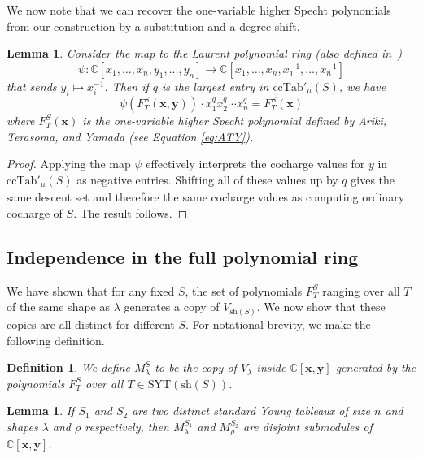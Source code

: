 \documentclass[11pt]{article}
\newtheorem{definition}[theo]{Definition}
\newtheorem{lemma}[theo]{Lemma}
\theoremstyle{definition}
\numberwithin{equation}{section}
\newcommand{\SYT}{\mathrm{SYT}}
\newcommand{\ccind}{\mathrm{ccTab}}
\newcommand{\sh}{\mathrm{sh}}
\begin{document}
We now note that we can recover the one-variable higher Specht polynomials from our construction by a substitution and a degree shift.

\begin{lemma}\label{lem:x-inverse}
	Consider the map to the Laurent polynomial ring (also defined in~\cite{HookBases}) $$\psi:\mathbb{C}[x_1,\ldots,x_n,y_1,\ldots,y_n]\to \mathbb{C}[x_1,\ldots,x_n,x_1^{-1},\ldots,x_n^{-1}]$$ that sends $y_i\mapsto x_i^{-1}$.   Then if $q$ is the largest entry in $\ccind'_\mu(S)$, we have $$\psi(F_T^S(\mathbf{x},\mathbf{y}))\cdot x_1^qx_2^q\cdots x_n^q=F_T^S(\mathbf{x})$$ where $F_T^S(\mathbf{x})$ is the one-variable higher Specht polynomial  defined by Ariki, Terasoma, and Yamada (see Equation \eqref{eq:ATY}).
\end{lemma}

\begin{proof}
	Applying the map $\psi$ effectively interprets the cocharge values for $y$ in $\ccind'_\mu(S)$ as negative entries.  Shifting all of these values up by $q$ gives the same descent set and therefore the same cocharge values as computing ordinary cocharge of $S$. The result follows.  
\end{proof}


\subsection{Independence in the full polynomial ring}

We have shown that for any fixed $S$, the set of polynomials $F_{T}^S$ ranging over all $T$ of the same shape as $\lambda$ generates a copy of $V_{\sh(S)}$.  We now show that these copies are all distinct for different $S$.  For notational brevity, we make the following definition.

\begin{definition}
	We define $M_\lambda^S$ to be the copy of $V_\lambda$ inside $\mathbb{C}[\mathbf{x},\mathbf{y}]$ generated by the polynomials $F_T^S$ over all $T\in\SYT(\sh(S))$.
\end{definition}


\begin{lemma}\label{lem:disjoint}
	If $S_1$ and $S_2$ are two distinct standard Young tableaux of size $n$ and shapes $\lambda$ and $\rho$ respectively, then $M_\lambda^{S_1}$ and $M_{\rho}^{S_2}$ are disjoint submodules of $\mathbb{C}[\mathbf{x},\mathbf{y}]$.
\end{lemma}
\end{document}

